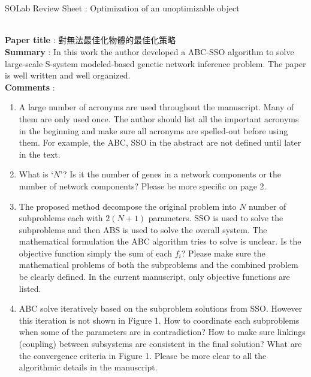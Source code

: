 \documentclass[12pt]{article}
\begin{document}
\begin{CJK}{UTF8}{bkai}
\begin{center}~\\~\\
{\Large {\sc SOLab Review Sheet : Optimization of an unoptimizable object}}\\~\\

\end{center}
\noindent \textbf{Paper title} : 對無法最佳化物體的最佳化策略\\

\noindent \textbf{Summary} : In this work the author developed a ABC-SSO algorithm to solve large-scale S-system modeled-based genetic network inference problem. The paper is well written and well organized.  \\

\noindent \textbf{Comments} : 
\begin{enumerate}
\item A large number of acronyms are used throughout the manuscript. Many of them are only used once. The author should list all the important acronyms in the beginning and make sure all acronyms are spelled-out before using them. For example, the ABC, SSO in the abstract are not defined until later in the text. 

\item What is `$N$'? Is it the number of genes in a network components or the number of network components? Please be more specific on page 2.

\item The proposed method decompose the original problem into $N$ number of subproblems each with $2(N+1)$ parameters. SSO is used to solve the subproblems and then ABS is used to solve the overall system. The mathematical formulation the ABC algorithm tries to solve is unclear. Is the objective function simply the sum of each $f_i$? Please make sure the mathematical problems of both the subproblems and the combined problem be clearly defined. In the current manuscript, only objective functions are listed.

\item ABC solve iteratively based on the subproblem solutions from SSO. However this iteration is not shown in Figure 1. How to coordinate each subproblems when some of the parameters are in contradiction? How to make sure linkings (coupling) between subsystems are consistent in the final solution? What are the convergence criteria in Figure 1. Please be more clear to all the algorithmic details in the manuscript.


\end{enumerate}
\end{CJK}
\end{document}
